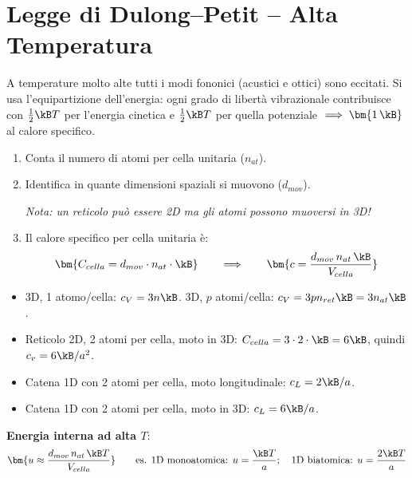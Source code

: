 \section{Legge di Dulong--Petit -- Alta Temperatura}
A temperature molto alte tutti i modi fononici (acustici e ottici) sono eccitati. Si usa l'equipartizione dell'energia: ogni grado di libertà vibrazionale contribuisce con $\frac{1}{2}\kB T$ per l'energia cinetica e $\frac{1}{2}\kB T$ per quella potenziale $\implies \bm{1\,\kB}$ al calore specifico.

\begin{enumerate}
    \item Conta il numero di atomi per cella unitaria ($n_{at}$).
    \item Identifica in quante dimensioni spaziali si muovono ($d_{mov}$).
    
    \textit{Nota: un reticolo può essere 2D ma gli atomi possono muoversi in 3D!}
    \item Il calore specifico per cella unitaria è:
    \[ \bm{C_{cella} = d_{mov}\cdot n_{at}\cdot \kB} \qquad\Longrightarrow\qquad
       \bm{c = \frac{d_{mov}\,n_{at}\,\kB}{V_{cella}} } \]
\end{enumerate}

\begin{itemize}
  \item 3D, 1 atomo/cella: $c_V = 3n\kB$. \quad 3D, $p$ atomi/cella: $c_V = 3pn_{ret}\kB = 3 n_{at}\kB$.
  \item Reticolo 2D, 2 atomi per cella, moto in 3D: $C_{cella}=3\cdot2\cdot\kB = 6\kB$, quindi $c_v = 6\kB/a^2$.
  \item Catena 1D con 2 atomi per cella, moto longitudinale: $c_L = 2\kB/a$.
  \item Catena 1D con 2 atomi per cella, moto in 3D: $c_L = 6\kB/a$.
\end{itemize}
\noindent\textbf{Energia interna ad alta $T$}:
\[ \bm{u \approx \frac{d_{mov}\,n_{at}\,\kB T}{V_{cella}}}\qquad\text{es. 1D monoatomica: } u=\frac{\kB T}{a};
   \quad\text{1D biatomica: } u = \frac{2\kB T}{a} \]

